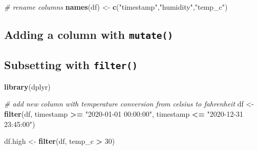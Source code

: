 \documentclass[
]{book}
\newenvironment{Shaded}{\begin{snugshade}}{\end{snugshade}}
\newcommand{\CommentTok}[1]{\textcolor[rgb]{0.56,0.35,0.01}{\textit{#1}}}
\newcommand{\DataTypeTok}[1]{\textcolor[rgb]{0.13,0.29,0.53}{#1}}
\newcommand{\DecValTok}[1]{\textcolor[rgb]{0.00,0.00,0.81}{#1}}
\newcommand{\FloatTok}[1]{\textcolor[rgb]{0.00,0.00,0.81}{#1}}
\newcommand{\KeywordTok}[1]{\textcolor[rgb]{0.13,0.29,0.53}{\textbf{#1}}}
\newcommand{\NormalTok}[1]{#1}
\newcommand{\OperatorTok}[1]{\textcolor[rgb]{0.81,0.36,0.00}{\textbf{#1}}}
\newcommand{\StringTok}[1]{\textcolor[rgb]{0.31,0.60,0.02}{#1}}
\let\oldShaded\Shaded
\let\endoldShaded\endShaded
\renewenvironment{Shaded}{\footnotesize\oldShaded}{\endoldShaded}
\begin{document}
\begin{Shaded}
\begin{Highlighting}[]
\CommentTok{# rename columns}
\KeywordTok{names}\NormalTok{(df) <-}\StringTok{ }\KeywordTok{c}\NormalTok{(}\StringTok{"timestamp"}\NormalTok{,}\StringTok{"humidity"}\NormalTok{,}\StringTok{"temp_c"}\NormalTok{)}
\end{Highlighting}
\end{Shaded}

\hypertarget{adding-a-column-with-mutate}{%
\subsection{\texorpdfstring{Adding a column with \texttt{mutate()}}{Adding a column with mutate()}}\label{adding-a-column-with-mutate}}

\begin{Shaded}
\end{Shaded}

\hypertarget{subsetting-with-filter}{%
\subsection{\texorpdfstring{Subsetting with \texttt{filter()}}{Subsetting with filter()}}\label{subsetting-with-filter}}

\begin{Shaded}
\begin{Highlighting}[]
\KeywordTok{library}\NormalTok{(dplyr)}

\CommentTok{# add new column with temperature conversion from celsius to fahrenheit}
\NormalTok{df <-}\StringTok{ }\KeywordTok{filter}\NormalTok{(df,}
\NormalTok{             timestamp }\OperatorTok{>=}\StringTok{ "2020-01-01 00:00:00"}\NormalTok{,}
\NormalTok{             timestamp }\OperatorTok{<=}\StringTok{ "2020-12-31 23:45:00"}\NormalTok{)}

\NormalTok{df.high <-}\StringTok{ }\KeywordTok{filter}\NormalTok{(df, temp_c }\OperatorTok{>}\StringTok{ }\DecValTok{30}\NormalTok{)}
\end{Highlighting}
\end{Shaded}
\end{document}
